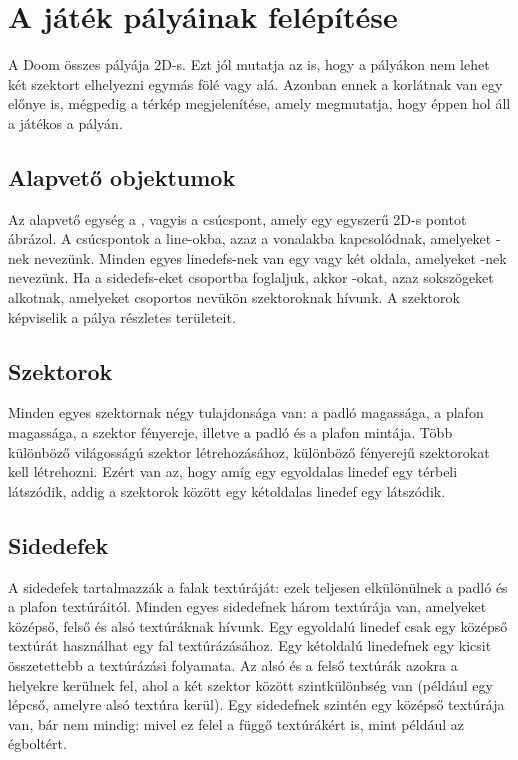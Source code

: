 \documentclass{thesis-ekf}
\theoremstyle{definition}
\theoremstyle{remark}
\begin{document}
\section{A játék pályáinak felépítése}

A Doom összes pályája 2D-s. Ezt jól mutatja az is, hogy a pályákon nem lehet két
szektort elhelyezni egymás fölé vagy alá. Azonban ennek a korlátnak van egy
előnye is, mégpedig a térkép megjelenítése, amely megmutatja, hogy éppen hol áll
a játékos a pályán. \cite[A Doom pályáinak felépítése]{doomengine}

\subsection{Alapvető objektumok}

Az alapvető egység a , vagyis a csúcspont, amely egy egyszerű
2D-s pontot ábrázol. A csúcspontok a line-okba, azaz a vonalakba kapcsolódnak,
amelyeket -nek nevezünk. Minden egyes linedefs-nek van egy vagy
két oldala, amelyeket -nek nevezünk. Ha a sidedefs-eket
csoportba foglaljuk, akkor -okat, azaz sokszögeket alkotnak,
amelyeket csoportos nevükön szektoroknak hívunk. A szektorok képviselik a pálya
részletes területeit. \cite[Alapvető objektumok]{doomengine}

\subsection{Szektorok}

Minden egyes szektornak négy tulajdonsága van: a padló magassága, a plafon
magassága, a szektor fényereje, illetve a padló és a plafon mintája. Több
különböző világosságú szektor létrehozásához, különböző fényerejű szektorokat
kell létrehozni. Ezért van az, hogy amíg egy egyoldalas linedef egy térbeli
 látszódik, addig a szektorok között egy kétoldalas linedef egy
 látszódik. \cite[Szektorok]{doomengine}

\subsection{Sidedefek}

A sidedefek tartalmazzák a falak textúráját: ezek teljesen elkülönülnek a padló
és a plafon textúráitól. Minden egyes sidedefnek három textúrája van, amelyeket
középső, felső és alsó textúráknak hívunk. Egy egyoldalú linedef csak egy
középső textúrát használhat egy fal textúrázásához. Egy kétoldalú linedefnek egy
kicsit összetettebb a textúrázási folyamata. Az alsó és a felső textúrák azokra
a helyekre kerülnek fel, ahol a két szektor között szintkülönbség van (például
egy lépcső, amelyre alsó textúra kerül). Egy sidedefnek szintén egy középső
textúrája van, bár nem mindig: mivel ez felel a függő textúrákért is, mint
például az égboltért. \cite[Sidedefs]{doomengine}
\end{document}
